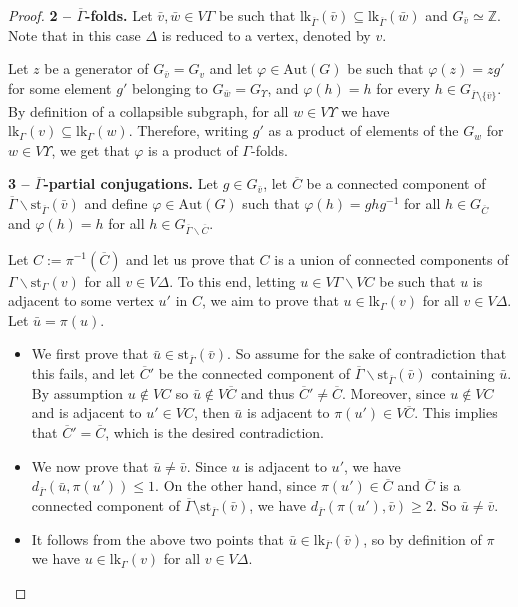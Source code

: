 \documentclass[a4paper,english,11pt]{article}
\theoremstyle{definition}
\theoremstyle{remark}
\newcommand{\st}{\mathrm{st}}
\newcommand{\lk}{\mathrm{lk}}
\newcommand{\Aut}{\mathrm{Aut}}
\newcommand{\bZ}{\mathbb{Z}}
\begin{document}
\begin{proof}
\textbf{2 – $\overline{\Gamma}$-folds.} Let $\bar{v},\bar{w}\in V\Gamma$ be such that $\lk_{\overline{\Gamma}}(\bar{v})\subseteq \lk_{\overline{\Gamma}}(\bar{w})$ and $G_{\bar{v}}\simeq \bZ$. Note that in this case $\Delta$ is reduced to a vertex, denoted by $v$. 

Let $z$ be a generator of $G_{\bar{v}}=G_v$ and let $\varphi\in \Aut(G)$ be such that $\varphi(z)=zg'$ for some element $g'$ belonging to $G_{\bar{w}}=G_\Upsilon$, and $\varphi(h)=h$ for every $h\in G_{\overline{\Gamma}\setminus\{\bar{v}\}}$. By definition of a collapsible subgraph, for all $w\in V\Upsilon$ we have $\lk_\Gamma(v)\subseteq \lk_\Gamma(w)$. Therefore, writing $g'$ as a product of elements of the $G_w$ for $w\in V\Upsilon$, we get that $\varphi$ is a product of $\Gamma$-folds.
\medskip

\textbf{3 – $\overline{\Gamma}$-partial conjugations.} Let $g\in G_{\bar{v}}$, let $\overline{C}$ be a connected component of $\overline{\Gamma}\backslash\st_{\overline{\Gamma}}(\bar v)$ and define $\varphi\in \Aut(G)$ such that $\varphi(h)=ghg^{-1}$ for all $h\in G_{\overline{C}}$ and $\varphi(h)=h$ for all $h\in G_{\overline{\Gamma}\backslash\overline{C}}$. 

Let $C:=\pi^{-1}(\overline{C})$ and let us prove that $C$ is a union of connected components of $\Gamma\backslash\st_\Gamma(v)$ for all $v\in V\Delta$. To this end, letting $u\in V\Gamma\backslash VC$ be such that $u$ is adjacent to some vertex $u'$ in $C$, we aim to prove that $u\in\lk_\Gamma(v)$ for all $v\in V\Delta$. Let $\bar u=\pi(u)$.
\begin{itemize}
    \item We first prove that $\bar u\in\st_{\overline{\Gamma}}(\bar v)$. So assume for the sake of contradiction that this fails, and let $\overline{C}'$ be the connected component of $\overline{\Gamma}\backslash\st_{\overline{\Gamma}}(\bar v)$ containing $\bar u$. By assumption $u\notin VC$ so  $\bar{u}\notin V\overline{C}$ and thus $\overline{C}'\neq \overline{C}$. Moreover, since $u\notin VC$ and is {adjacent} to $u'\in VC$, then $\bar{u}$ is adjacent to $\pi(u')\in V\overline{C}$. This implies that $\overline{C}'=\overline{C}$, which is the desired contradiction. 
    \item We now prove that $\bar u\neq\bar{v}$. Since $u$ is adjacent to $u'$, we have $d_{\overline\Gamma}(\bar{u},\pi(u'))\le 1$. On the other hand, since $\pi(u')\in \overline{C}$ and $\overline{C}$ is a connected component of $\overline{\Gamma}\setminus\st_{\overline{\Gamma}}(\bar{v})$, we have $d_{\overline{\Gamma}}(\pi(u'),\bar{v})\ge 2$. So $\bar{u}\neq \bar{v}$.
    \item It follows from the above two points that $\bar{u}\in \lk_{\overline{\Gamma}}(\bar{v})$, so by definition of $\pi$ we have $u\in\lk_\Gamma(v)$ for all $v\in V\Delta$.
\end{itemize}


\end{proof}
\end{document}
